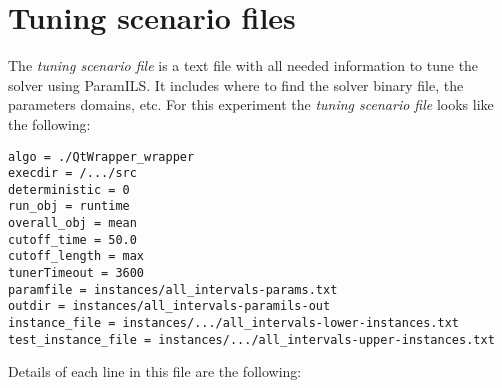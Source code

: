 \section{Tuning scenario files}

The {\it tuning scenario file} is a text file with all needed information to tune the solver using {\sc ParamILS}. It includes where to find the solver binary file, the parameters domains, etc. For this experiment the {\it tuning scenario file} looks like the following:

\begin{shadedbox}
	\texttt{algo = ./QtWrapper\_wrapper\\
		execdir = /.../src \\
		deterministic = 0 \\
		run\_obj = runtime \\
		overall\_obj = mean \\
		cutoff\_time = 50.0 \\
		cutoff\_length = max \\
		tunerTimeout = 3600 \\
		paramfile = instances/all\_intervals-params.txt \\
		outdir = instances/all\_intervals-paramils-out \\
		instance\_file = instances/.../all\_intervals-lower-instances.txt \\
		test\_instance\_file = instances/.../all\_intervals-upper-instances.txt \\
	}
\end{shadedbox}

Details of each line in this file are the following:

